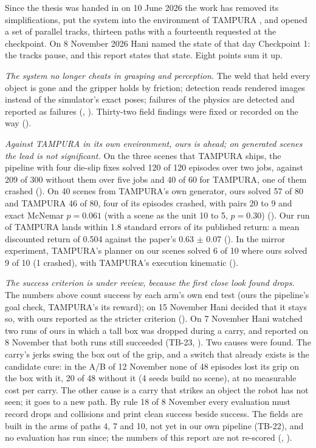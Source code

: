 
\begin{summary}
Since the thesis \cite{alassiri2026thesis} was handed in on 10 June 2026 the work has
removed its simplifications, put the system into the environment of TAMPURA
\cite{curtis2024partially}, and opened a set of parallel tracks, thirteen paths with a
fourteenth requested at the checkpoint. On 8 November 2026 Hani named the state of that day Checkpoint 1: the
tracks pause, and this report states that state. Eight points sum it up.

\emph{The system no longer cheats in grasping and perception.} The weld that held
every object is gone and the gripper holds by friction; detection reads rendered
images instead of the simulator's exact poses; failures of the physics are
detected and reported as failures (, ). Thirty-two field findings were
fixed or recorded on the way ().

\emph{Against TAMPURA in its own environment, ours is ahead; on generated scenes the
lead is not significant.} On the three scenes that TAMPURA ships, the pipeline with four die-slip
fixes solved 120 of 120 episodes over two jobs, against 209 of 300 without them over five
jobs and 40 of 60 for TAMPURA, one of them crashed (). On 40
scenes from TAMPURA's own generator, ours solved 57 of 80 and TAMPURA 46 of 80, four of
its episodes crashed, with pairs 20 to 9 and exact McNemar $p = 0.061$ (with a scene as
the unit 10 to 5, $p = 0.30$) (). Our run
of TAMPURA lands within 1.8 standard errors of its published return: a mean discounted
return of 0.504 against the paper's 0.63 $\pm$ 0.07 (). In the mirror experiment, TAMPURA's planner on our scenes
solved 6 of 10 where ours solved 9 of 10 (1 crashed), with TAMPURA's execution kinematic
(). 

\emph{The success criterion is under review, because the first close look found drops.}
The numbers above count success by each arm's own end test (ours the pipeline's goal check, TAMPURA's its reward); on 15 November Hani decided that it stays so, with ours reported as the stricter criterion (). On 7 November Hani watched two runs of
ours in which a tall box was dropped during a carry, and reported on 8 November that both runs still succeeded
(TB-23, ). Two causes were found. The carry's jerks swing the box out of the
grip, and a switch that already exists is the candidate cure: in the A/B of 12 November none of 48
episodes lost its grip on the box with it, 20 of 48 without it (4 seeds build no scene), at no
measurable cost per carry. The other cause is
a carry that strikes an object the robot has not seen; it goes to a new path. By rule 18 of 8
November every evaluation must record drops and collisions and print clean success beside
success. The fields are built in the arms of paths 4, 7 and 10, not yet in our own pipeline (TB-22), and no evaluation has run since; the numbers of this report are not re-scored (, ).


\end{summary}
